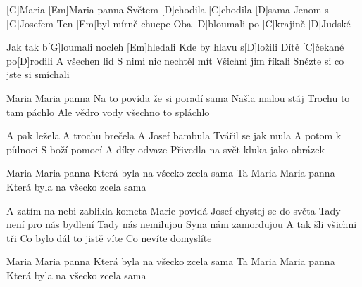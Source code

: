
[G]Maria [Em]Maria panna
Světem [D]chodila [C]chodila [D]sama
Jenom s [G]Josefem
Ten [Em]byl mírně chucpe
Oba [D]bloumali po [C]krajině [D]Judské

Jak tak b[G]loumali 
nocleh [Em]hledali
Kde by hlavu s[D]ložili
Dítě [C]\null čekané po[D]rodili
A všechen lid
S nimi nic nechtěl mít
Všichni jim říkali
Snězte si co jste si smíchali

Maria Maria panna
Na to povída že si poradí sama
Našla malou stáj
Trochu to tam páchlo
Ale vědro vody všechno to spláchlo

A pak ležela
A trochu brečela
A Josef bambula
Tvářil se jak mula
A potom k půlnoci
S boží pomocí
A díky odvaze
Přivedla na svět kluka jako obrázek

Maria Maria panna
Která byla na všecko zcela sama
Ta Maria Maria panna
Která byla na všecko zcela sama

A zatím na nebi zablikla kometa
Marie povídá Josef chystej se do světa
Tady není pro nás bydlení
Tady nás nemilujou
Syna nám zamordujou
A tak šli všichni tři
Co bylo dál to jistě víte
Co nevíte domyslíte

Maria Maria panna
Která byla na všecko zcela sama
Ta Maria Maria panna
Která byla na všecko zcela sama
